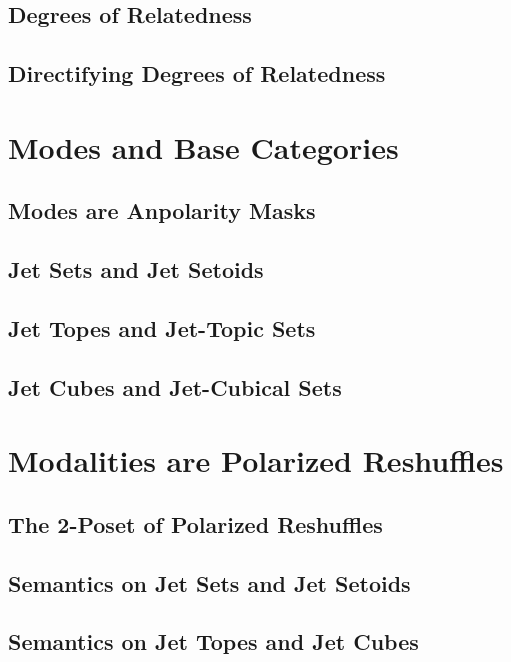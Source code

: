 \documentclass{lmcs} %
\theoremstyle{plain}\newtheorem{satz}[thm]{Satz} %
\theoremstyle{plain}
\theoremstyle{definition}
\begin{document}
\subsection{Degrees of Relatedness}

\subsection{Directifying Degrees of Relatedness}

\section{Modes and Base Categories}

\subsection{Modes are Anpolarity Masks}

\subsection{Jet Sets and Jet Setoids}

\subsection{Jet Topes and Jet-Topic Sets}

\subsection{Jet Cubes and Jet-Cubical Sets}

\section{Modalities are Polarized Reshuffles}

\subsection{The 2-Poset of Polarized Reshuffles}

\subsection{Semantics on Jet Sets and Jet Setoids}

\subsection{Semantics on Jet Topes and Jet Cubes}
\end{document}
